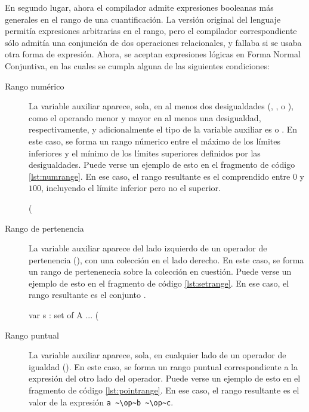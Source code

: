 En segundo lugar, ahora el compilador admite expresiones booleanas más generales
en el rango de una cuantificación. La versión original del lenguaje permitía
expresiones arbitrarias en el rango, pero el compilador correspondiente sólo
admitía una conjunción de dos operaciones relacionales, y fallaba si se usaba
otra forma de expresión. Ahora, se aceptan expresiones lógicas en Forma Normal
Conjuntiva, en las cuales se cumpla alguna de las siguientes condiciones:

\begin{description}%

  \item [Rango numérico] La variable auxiliar aparece, sola, en al menos dos
  desigualdades (\ingra{<}, \ingra{<=}, \ingra{>} o \ingra{>=}), como el
  operando menor y mayor en al menos una desigualdad, respectivamente, y
  adicionalmente el tipo de la variable auxiliar es  o .
  En este caso, se forma un rango númerico entre el máximo de los límites
  inferiores y el mínimo de los límites superiores definidos por las
  desigualdades. Puede verse un ejemplo de esto en el fragmento de código
  \ref{lst:numrange}. En ese caso, el rango resultante es el comprendido entre $0$ y $100$,
  incluyendo  el límite inferior pero no el superior.

\begin{gracielacode}[caption=Cuantificación con rango numérico, label=lst:numrange]
(%
\end{gracielacode}

  \item [Rango de pertenencia] La variable auxiliar aparece del lado izquierdo
  de un operador de pertenencia (\Elem), con una colección en el lado derecho.
  En este caso, se forma un rango de pertenenecia sobre la colección en
  cuestión. Puede verse un ejemplo de esto en el fragmento de código
  \ref{lst:setrange}.  En ese caso, el rango resultante es el conjunto .

\begin{gracielacode}[caption=Cuantificación con rango de pertenencia, label=lst:setrange]
var s : set of A
...
(%
\end{gracielacode}

  \item [Rango puntual] La variable auxiliar aparece, sola, en cualquier lado de
  un operador de igualdad (\ingra{==}). En este caso, se forma un rango puntual
  correspondiente a la expresión del otro lado del operador. Puede verse un
  ejemplo de esto en el fragmento de código \ref{lst:pointrange}. En ese caso,
  el rango resultante es el valor de la expresión
  \lstinline[language=graciela]{a ~\op~b ~\op~c}.


\end{description}
